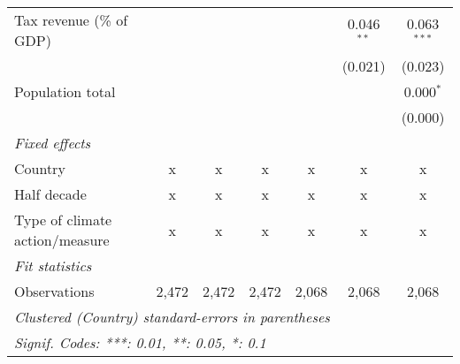 \begin{tabular}{lcccccc}
   Tax revenue (\% of GDP)                                         &         &                &               &               & 0.046$^{**}$  & 0.063$^{***}$\\   
                                                                   &         &                &               &               & (0.021)       & (0.023)\\   
   Population total                                                &         &                &               &               &               & 0.000$^{*}$\\   
                                                                   &         &                &               &               &               & (0.000)\\   
   \emph{Fixed effects}\\
   Country                                                         & x       & x              & x             & x             & x             & x\\  
   Half decade                                                     & x       & x              & x             & x             & x             & x\\  
   Type of climate action/measure                                  & x       & x              & x             & x             & x             & x\\  
   \midrule \emph{Fit statistics}\\
   Observations                                                    & 2,472   & 2,472          & 2,472         & 2,068         & 2,068         & 2,068\\  
   \midrule
   \multicolumn{7}{l}{\emph{Clustered (Country) standard-errors in parentheses}}\\
   \multicolumn{7}{l}{\emph{Signif. Codes: ***: 0.01, **: 0.05, *: 0.1}}\\
\end{tabular}
\par\endgroup


